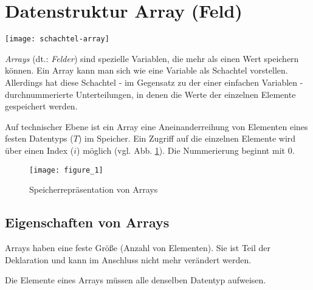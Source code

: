 \documentclass[loesung]{schulein}
\begin{document}
 
\section*{Datenstruktur Array (Feld)}

\begin{floatingfigure}[r]{3.2cm}
\texttt{[image: schachtel-array]}
\end{floatingfigure}
\textit{Arrays} (dt.: \textit{Felder}) sind spezielle Variablen, die mehr als einen Wert speichern können. Ein Array kann man sich wie eine Variable als Schachtel vorstellen. Allerdings hat diese Schachtel - im Gegensatz zu der einer einfachen Variablen - durchnummerierte Unterteilungen, in denen die Werte der einzelnen Elemente gespeichert werden.

Auf technischer Ebene ist ein Array eine Aneinanderreihung von Elementen eines festen Datentyps ($T$) im Speicher. Ein Zugriff auf die einzelnen Elemente wird über einen Index ($i$) möglich (vgl. Abb. \ref{fig_1}). Die Nummerierung beginnt mit 0.




\begin{figure}[h]
\centering
\texttt{[image: figure\_1]}
\caption{Speicherrepräsentation von Arrays}
\label{fig_1}
\end{figure}

\subsection*{Eigenschaften von Arrays}
\begin{smallitemize}
\item Arrays haben eine feste Größe (Anzahl von Elementen). Sie ist Teil der Deklaration und kann im Anschluss nicht mehr verändert werden.
\item Die Elemente eines Arrays müssen alle denselben Datentyp aufweisen.
\end{smallitemize}
\end{document}

